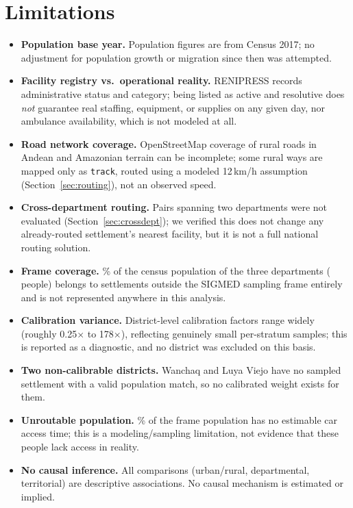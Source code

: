 \section{Limitations}
\label{sec:limitations}

\begin{itemize}
  \item \textbf{Population base year.} Population figures are from Census 2017; no adjustment for population growth or migration since then was attempted.
  \item \textbf{Facility registry vs.\ operational reality.} RENIPRESS records administrative status and category; being listed as active and resolutive does \emph{not} guarantee real staffing, equipment, or supplies on any given day, nor ambulance availability, which is not modeled at all.
  \item \textbf{Road network coverage.} OpenStreetMap coverage of rural roads in Andean and Amazonian terrain can be incomplete; some rural ways are mapped only as \texttt{track}, routed using a modeled 12\,km/h assumption (Section~\ref{sec:routing}), not an observed speed.
  \item \textbf{Cross-department routing.} Pairs spanning two departments were not evaluated (Section~\ref{sec:crossdept}); we verified this does not change any already-routed settlement's nearest facility, but it is not a full national routing solution.
  \item \textbf{Frame coverage.} \OutsideFramePct\% of the census population of the three departments (\OutsideFramePop{} people) belongs to settlements outside the SIGMED sampling frame entirely and is not represented anywhere in this analysis.
  \item \textbf{Calibration variance.} District-level calibration factors range widely (roughly 0.25$\times$ to 178$\times$), reflecting genuinely small per-stratum samples; this is reported as a diagnostic, and no district was excluded on this basis.
  \item \textbf{Two non-calibrable districts.} Wanchaq and Luya Viejo have no sampled settlement with a valid population match, so no calibrated weight exists for them.
  \item \textbf{Unroutable population.} \CovNoTimeTotal\% of the frame population has no estimable car access time; this is a modeling/sampling limitation, not evidence that these people lack access in reality.
  \item \textbf{No causal inference.} All comparisons (urban/rural, departmental, territorial) are descriptive associations. No causal mechanism is estimated or implied.
\end{itemize}
